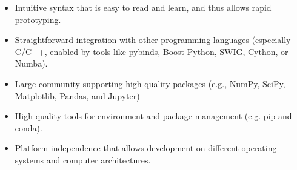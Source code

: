 \begin{itemize}
    \item Intuitive syntax that is easy to read and learn, and thus allows rapid prototyping.
    \item Straightforward integration with other programming languages (especially C/C++\cite{Stroustrup1995}, enabled by tools like pybinds\cite{Wenzel2011}, Boost Python\cite{Koranne2011}, SWIG\cite{Beazley1996}, Cython\cite{Behnel2011}, or Numba\cite{Lam2015}).
    \item Large community supporting high-quality packages (e.g., NumPy\cite{Vanderwalt2011}, SciPy\cite{Virtanen2020}, Matplotlib\cite{Hunter2007}, Pandas\cite{Mckinney2010}, and Jupyter\cite{Kluyver2016})
    \item High-quality tools for environment and package management (e.g. pip\cite{Pypi2021} and conda\cite{Anaconda2020}).
    \item Platform independence that allows development on different operating systems and computer architectures.
\end{itemize}

